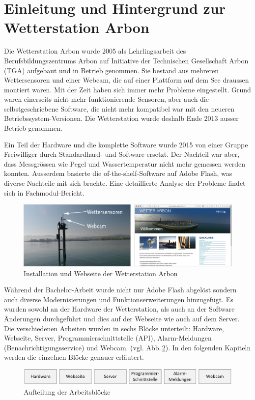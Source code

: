 \section*{Einleitung und Hintergrund zur Wetterstation Arbon}

Die Wetterstation Arbon wurde 2005 als Lehrlingsarbeit des Berufsbildungszentrums Arbon auf Initiative der Technischen Gesellschaft Arbon (TGA) aufgebaut und in Betrieb genommen. Sie bestand aus mehreren Wettersensoren und einer Webcam, die auf einer Plattform auf dem See draussen montiert waren. Mit der Zeit haben sich immer mehr Probleme eingestellt. Grund waren einerseits nicht mehr funktionierende Sensoren, aber auch die selbstgeschriebene Software, die nicht mehr kompatibel war mit den neueren Betriebssystem-Versionen. Die Wetterstation wurde deshalb Ende 2013 ausser Betrieb genommen.

Ein Teil der Hardware und die komplette Software wurde 2015 von einer Gruppe Freiwilliger durch Standardhard- und Software ersetzt. Der Nachteil war aber, dass Messgrössen wie Pegel und Wassertemperatur nicht mehr gemessen werden konnten. Ausserdem basierte die of-the-shelf-Software auf Adobe Flash, was diverse Nachteile mit sich brachte. Eine detaillierte Analyse der Probleme findet sich in Fachmodul-Bericht\cite{BilWie2018MUIu}.

\vspace{5mm} %
\begin{figure}[htbp!]
	\centering
	\includegraphics[width=1\linewidth]{img/kombi}
	\caption{Installation und Webseite der Wetterstation Arbon}
	\label{img:wetterstation}
\end{figure}
\vspace{3mm} %

\noindent
Während der Bachelor-Arbeit wurde nicht nur Adobe Flash abgelöst sondern auch diverse Modernisierungen und Funktionserweiterungen hinzugefügt. Es wurden sowohl an der Hardware der Wetterstation, als auch an der Software Änderungen durchgeführt und dies auf der Webseite wie auch auf dem Server. Die verschiedenen Arbeiten wurden in sechs Blöcke unterteilt: Hardware, Webseite, Server, Programmierschnittstelle (API), Alarm-Meldungen (Benachrichtigungsservice) und Webcam. (vgl. Abb.\,\ref{img:module}). In den folgenden Kapiteln werden die einzelnen Blöcke genauer erläutert.

\vspace{5mm} %
\begin{figure}[htbp!]
	\centering
	\includegraphics[width=1\linewidth]{img/module}
	\caption{Aufteilung der Arbeitsblöcke}
	\label{img:module}
\end{figure}
\newpage
